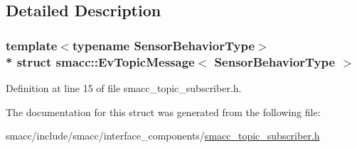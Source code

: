 \subsection{Detailed Description}
\subsubsection*{template$<$typename Sensor\+Behavior\+Type$>$\\*
struct smacc\+::\+Ev\+Topic\+Message$<$ Sensor\+Behavior\+Type $>$}



Definition at line 15 of file smacc\+\_\+topic\+\_\+subscriber.\+h.



The documentation for this struct was generated from the following file\+:\begin{DoxyCompactItemize}
\item 
smacc/include/smacc/interface\+\_\+components/\hyperlink{smacc__topic__subscriber_8h}{smacc\+\_\+topic\+\_\+subscriber.\+h}\end{DoxyCompactItemize}
